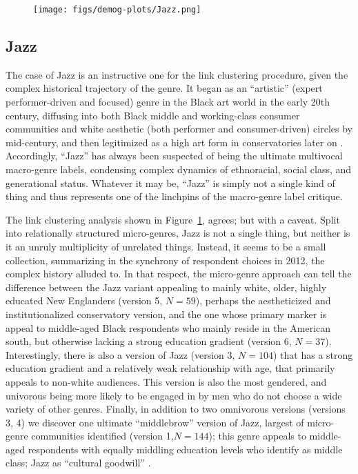  \begin{figure}[ht!]
 \centering
 \texttt{[image: figs/demog-plots/Jazz.png]}
 \caption{}
  \label{fig:jazz}
 \end{figure}
 
 \subsection{Jazz}

The case of Jazz is an instructive one for the link clustering procedure, given the complex historical trajectory of the genre. It began as an ``artistic'' (expert performer-driven and focused) genre in the Black art world in the early 20th century, diffusing into both Black middle and working-class consumer communities and white aesthetic (both performer and consumer-driven) circles by mid-century, and then legitimized as a high art form in conservatories later on \citep[see][]{lopes02}. Accordingly, ``Jazz'' has always been suspected of being the ultimate multivocal macro-genre labels, condensing complex dynamics of ethnoracial, social class, and generational status. Whatever it may be, ``Jazz'' is simply not a single kind of thing and thus represents one of the linchpins of the macro-genre label critique. 

The link clustering analysis shown in Figure~\ref{fig:jazz}, agrees; but with a caveat. Split into relationally structured micro-genres, Jazz is not a single thing, but neither is it an unruly multiplicity of unrelated things. Instead, it seems to be a small collection, summarizing in the synchrony of respondent choices in 2012, the complex history alluded to. In that respect, the micro-genre approach can tell the difference between the Jazz variant appealing to mainly white, older, highly educated New Englanders (version 5, $N = 59$), perhaps the aestheticized and institutionalized conservatory version, and the one whose primary marker is appeal to middle-aged Black respondents who mainly reside in the American south, but otherwise lacking a strong education gradient (version 6, $N = 37$). Interestingly, there is also a version of Jazz (version 3, $N = 104$) that has a strong education gradient and a relatively weak relationship with age, that primarily appeals to non-white audiences. This version is also the most gendered, and univorous being more likely to be engaged in by men who do not choose a wide variety of other genres. Finally, in addition to two omnivorous versions (versions 3, 4) we discover one ultimate ``middlebrow'' version of Jazz, largest of micro-genre communities identified (version 1,$N = 144$); this genre appeals to middle-aged respondents with equally middling education levels who identify as middle class; Jazz as ``cultural goodwill'' \citep{bourdieu84}.

